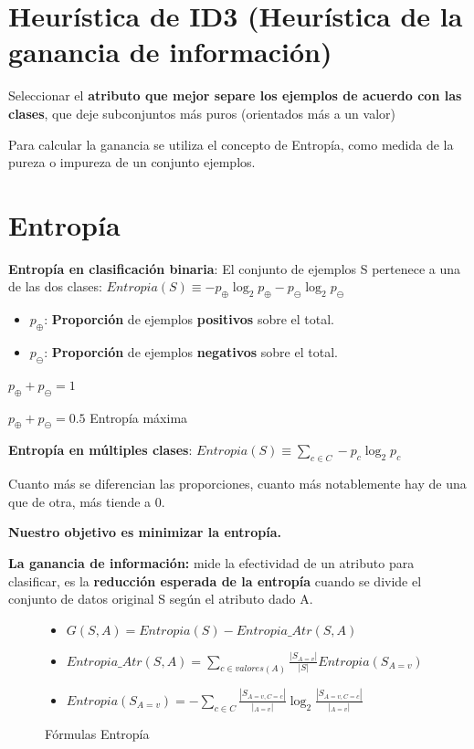 \documentclass[12pt, twoside, openright]{report} %
\begin{document}
\section{Heurística de ID3 (Heurística de la ganancia de
información)}

Seleccionar el \textbf{atributo que mejor separe los ejemplos de acuerdo
con las clases}, que deje subconjuntos más puros (orientados más a un
valor)

Para calcular la ganancia se utiliza el concepto de Entropía, como medida de la pureza o impureza de un conjunto ejemplos.
\pagebreak
\section{Entropía}

\textbf{Entropía en clasificación binaria}: El conjunto de ejemplos S
pertenece a una de las dos clases:
\textbf{\(Entropia(S) \equiv -p_\oplus \log _2 p_\oplus -p_\ominus \log _2 p_\ominus\)}

\begin{itemize}
\item
  \(p_\oplus\): \textbf{Proporción} de ejemplos \textbf{positivos} sobre el total.
\item
  \(p_\ominus\): \textbf{Proporción} de ejemplos \textbf{negativos} sobre el total.
\end{itemize}

\(p_\oplus+p_\ominus=1\)

\(p_\oplus+p_\ominus=0.5\) Entropía máxima

\textbf{Entropía en múltiples clases}:
\(Entropia(S) \equiv \sum_{c\in C} -p_c \log _2 p_c\)

Cuanto más se diferencian las proporciones, cuanto más notablemente hay de una que de otra, más tiende a 0.

\textbf{Nuestro objetivo es minimizar la entropía.}

\textbf{La ganancia de información:} mide la efectividad de un atributo
para clasificar, es la \textbf{reducción esperada de la entropía} cuando
se divide el conjunto de datos original S según el atributo dado A.
\begin{figure}[H]
  \begin{itemize}
    \item
      \(G(S, A)=Entropia(S) - Entropia\_ Atr(S, A)\)
    \item
      \(Entropia\_ Atr(S, A)= \sum_{c \in valores(A)} \frac {|S_{A=v}|}{|S|} Entropia(S_{A=v})\)
    \item
      \(Entropia(S_{A=v})= -\sum_{c \in C} \frac {|S_{A=v, C=c}|}{|_{A=v}|} \log_2 \frac {|S_{A=v,C=c}|}{|_{A=v}|}\)
    \end{itemize}
    \captionsetup{justification=centering}
  \caption{Fórmulas Entropía}
\end{figure}
\end{document}
